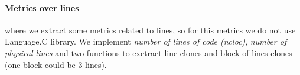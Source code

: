 \paragraph{Metrics over lines} where we extract some metrics related to lines, so for this metrics we do not use Language.C library.
We implement \textit{number of lines of code (ncloc)}, \textit{number of physical lines} and two functions to exctract line clones and block of lines clones (one block
could be 3 lines).


